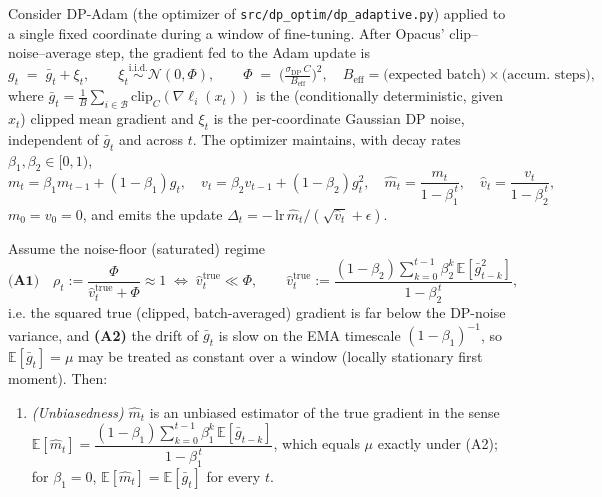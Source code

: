 \begin{theorem}\label{thm:first-moment}
Consider DP-Adam (the optimizer of \texttt{src/dp\_optim/dp\_adaptive.py}) applied to a single
fixed coordinate during a window of fine-tuning. After Opacus' clip--noise--average step, the
gradient fed to the Adam update is
\begin{equation*}
  g_t \;=\; \bar g_t + \xi_t,\qquad
  \xi_t \overset{\text{i.i.d.}}{\sim}\mathcal N(0,\Phi),\qquad
  \Phi \;=\; \Big(\tfrac{\sigma_{\mathrm{DP}}\,C}{B_{\mathrm{eff}}}\Big)^{2},\quad
  B_{\mathrm{eff}}=\text{(expected batch)}\times\text{(accum.\ steps)},
\end{equation*}
where $\bar g_t=\tfrac1B\sum_{i\in\mathcal B}\mathrm{clip}_C(\nabla\ell_i(x_t))$ is the (conditionally
deterministic, given $x_t$) clipped mean gradient and $\xi_t$ is the per-coordinate Gaussian DP
noise, independent of $\bar g_t$ and across $t$. The optimizer maintains, with decay rates
$\beta_1,\beta_2\in[0,1)$,
\begin{equation*}
  m_t=\beta_1 m_{t-1}+(1-\beta_1)g_t,\quad
  v_t=\beta_2 v_{t-1}+(1-\beta_2)g_t^2,\quad
  \hat m_t=\frac{m_t}{1-\beta_1^{\,t}},\quad
  \hat v_t=\frac{v_t}{1-\beta_2^{\,t}},
\end{equation*}
$m_0=v_0=0$, and emits the update $\Delta_t=-\,\mathrm{lr}\,\hat m_t/(\sqrt{\hat v_t}+\epsilon)$.

Assume the noise-floor (saturated) regime
\begin{equation*}
  \textbf{(A1)}\quad \rho_t:=\frac{\Phi}{\hat v_t^{\mathrm{true}}+\Phi}\approx 1
  \;\Longleftrightarrow\; \hat v_t^{\mathrm{true}}\ll\Phi,
  \qquad
  \hat v_t^{\mathrm{true}}:=\frac{(1-\beta_2)\sum_{k=0}^{t-1}\beta_2^k\,\mathbb E[\bar g_{t-k}^2]}{1-\beta_2^{\,t}},
\end{equation*}
i.e. the squared true (clipped, batch-averaged) gradient is far below the DP-noise variance, and
\textbf{(A2)} the drift of $\bar g_t$ is slow on the EMA timescale $(1-\beta_1)^{-1}$, so $\mathbb
E[\bar g_t]=\mu$ may be treated as constant over a window (locally stationary first moment). Then:

\begin{enumerate}
\item[\textbf{(i)}] \emph{(Unbiasedness)} $\hat m_t$ is an unbiased estimator of the true gradient
in the sense $\mathbb E[\hat m_t]=\dfrac{(1-\beta_1)\sum_{k=0}^{t-1}\beta_1^k\,\mathbb E[\bar g_{t-k}]}{1-\beta_1^{\,t}}$,
which equals $\mu$ exactly under (A2); for $\beta_1=0$, $\mathbb E[\hat m_t]=\mathbb E[\bar g_t]$
for every $t$.


\end{enumerate}
\end{theorem}
